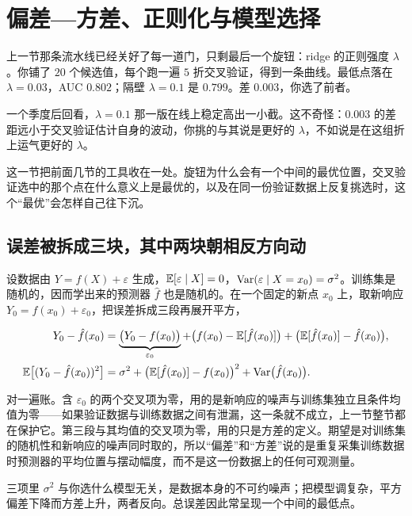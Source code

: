 \section{偏差---方差、正则化与模型选择}
\label{sec:11-Mathematical-Statistics/06-Resampling-and-Model-Selection/04}

上一节那条流水线已经关好了每一道门，只剩最后一个旋钮：ridge 的正则强度 \(\lambda\)。你铺了 \(20\) 个候选值，每个跑一遍 \(5\) 折交叉验证，得到一条曲线。最低点落在 \(\lambda=0.03\)，AUC \(0.802\)；隔壁 \(\lambda=0.1\) 是 \(0.799\)。差 \(0.003\)，你选了前者。

一个季度后回看，\(\lambda=0.1\) 那一版在线上稳定高出一小截。这不奇怪：\(0.003\) 的差距远小于交叉验证估计自身的波动，你挑的与其说是更好的 \(\lambda\)，不如说是在这组折上运气更好的 \(\lambda\)。

这一节把前面几节的工具收在一处。旋钮为什么会有一个中间的最优位置，交叉验证选中的那个点在什么意义上是最优的，以及在同一份验证数据上反复挑选时，这个``最优''会怎样自己往下沉。

\subsection{误差被拆成三块，其中两块朝相反方向动}

设数据由 \(Y=f(X)+\varepsilon\) 生成，\(\mathbb{E}[\varepsilon\mid X]=0\)，\(\operatorname{Var}(\varepsilon\mid X=x_0)=\sigma^2\)。训练集是随机的，因而学出来的预测器 \(\hat f\) 也是随机的。在一个固定的新点 \(x_0\) 上，取新响应 \(Y_0=f(x_0)+\varepsilon_0\)，把误差拆成三段再展开平方，

\[
\begin{aligned}
Y_0-\hat f(x_0)
&=\underbrace{\bigl(Y_0-f(x_0)\bigr)}_{\varepsilon_0}
+\bigl(f(x_0)-\mathbb{E}[\hat f(x_0)]\bigr)
+\bigl(\mathbb{E}[\hat f(x_0)]-\hat f(x_0)\bigr),\\
\mathbb{E}\bigl[(Y_0-\hat f(x_0))^2\bigr]
&=\sigma^2+\bigl(\mathbb{E}[\hat f(x_0)]-f(x_0)\bigr)^2+\operatorname{Var}\bigl(\hat f(x_0)\bigr).
\end{aligned}
\]

对一遍账。含 \(\varepsilon_0\) 的两个交叉项为零，用的是新响应的噪声与训练集独立且条件均值为零——如果验证数据与训练数据之间有泄漏，这一条就不成立，上一节整节都在保护它。第三段与其均值的交叉项为零，用的只是方差的定义。期望是对训练集的随机性和新响应的噪声同时取的，所以``偏差''和``方差''说的是重复采集训练数据时预测器的平均位置与摆动幅度，而不是这一份数据上的任何可观测量。

三项里 \(\sigma^2\) 与你选什么模型无关，是数据本身的不可约噪声；把模型调复杂，平方偏差下降而方差上升，两者反向。总误差因此常呈现一个中间的最低点。

